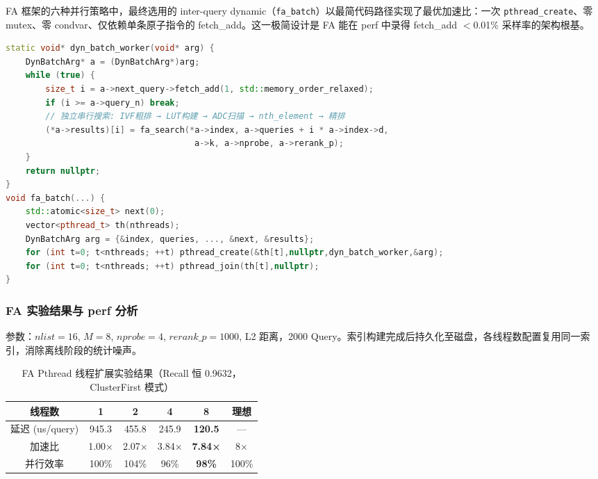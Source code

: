\documentclass[UTF8,a4paper,10pt]{ctexart}
\begin{document}
FA 框架的六种并行策略中，最终选用的 inter-query dynamic（\texttt{fa\_batch}）以最简代码路径实现了最优加速比：一次 \texttt{pthread\_create}、零 mutex、零 condvar、仅依赖单条原子指令的 fetch\_add。这一极简设计是 FA 能在 perf 中录得 fetch\_add $<$0.01\% 采样率的架构根基。

\begin{lstlisting}[language=C++, caption={FA inter-query 动态批量：atomic fetch\_add (fa\_parallel.h)}]
static void* dyn_batch_worker(void* arg) {
    DynBatchArg* a = (DynBatchArg*)arg;
    while (true) {
        size_t i = a->next_query->fetch_add(1, std::memory_order_relaxed);
        if (i >= a->query_n) break;
        // 独立串行搜索: IVF粗排 → LUT构建 → ADC扫描 → nth_element → 精排
        (*a->results)[i] = fa_search(*a->index, a->queries + i * a->index->d,
                                      a->k, a->nprobe, a->rerank_p);
    }
    return nullptr;
}
void fa_batch(...) {
    std::atomic<size_t> next(0);
    vector<pthread_t> th(nthreads);
    DynBatchArg arg = {&index, queries, ..., &next, &results};
    for (int t=0; t<nthreads; ++t) pthread_create(&th[t],nullptr,dyn_batch_worker,&arg);
    for (int t=0; t<nthreads; ++t) pthread_join(th[t],nullptr);
}
\end{lstlisting}

\subsubsection{FA 实验结果与 perf 分析}

参数：$nlist=16$, $M=8$, $nprobe=4$, $rerank\_p=1000$, L2 距离，2000 Query。索引构建完成后持久化至磁盘，各线程数配置复用同一索引，消除离线阶段的统计噪声。

\begin{table}[H]
\centering
\caption{FA Pthread 线程扩展实验结果（Recall 恒 0.9632，ClusterFirst 模式）}
\begin{tabular}{cccccc}
\hline
线程数 & 1 & 2 & 4 & 8 & 理想 \\
\hline
延迟 (us/query) & 945.3 & 455.8 & 245.9 & \textbf{120.5} & — \\
加速比 & 1.00× & 2.07× & 3.84× & \textbf{7.84×} & 8× \\
并行效率 & 100\% & 104\% & 96\% & \textbf{98\%} & 100\% \\
\hline
\end{tabular}
\end{table}
\end{document}
